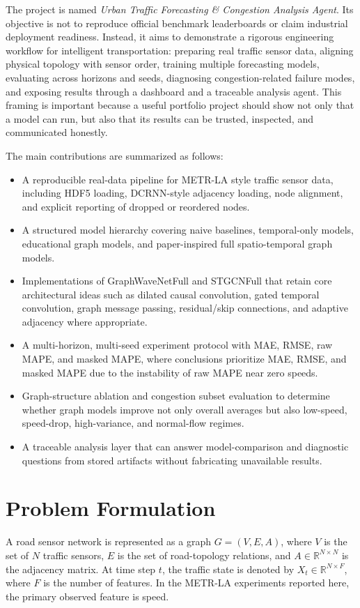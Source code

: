 \documentclass[11pt]{article}
\begin{document}
The project is named \emph{Urban Traffic Forecasting \& Congestion Analysis Agent}. Its objective is not to reproduce official benchmark leaderboards or claim industrial deployment readiness. Instead, it aims to demonstrate a rigorous engineering workflow for intelligent transportation: preparing real traffic sensor data, aligning physical topology with sensor order, training multiple forecasting models, evaluating across horizons and seeds, diagnosing congestion-related failure modes, and exposing results through a dashboard and a traceable analysis agent. This framing is important because a useful portfolio project should show not only that a model can run, but also that its results can be trusted, inspected, and communicated honestly.

The main contributions are summarized as follows:
\begin{itemize}[leftmargin=*]
  \item A reproducible real-data pipeline for METR-LA style traffic sensor data, including HDF5 loading, DCRNN-style adjacency loading, node alignment, and explicit reporting of dropped or reordered nodes.
  \item A structured model hierarchy covering naive baselines, temporal-only models, educational graph models, and paper-inspired full spatio-temporal graph models.
  \item Implementations of GraphWaveNetFull and STGCNFull that retain core architectural ideas such as dilated causal convolution, gated temporal convolution, graph message passing, residual/skip connections, and adaptive adjacency where appropriate.
  \item A multi-horizon, multi-seed experiment protocol with MAE, RMSE, raw MAPE, and masked MAPE, where conclusions prioritize MAE, RMSE, and masked MAPE due to the instability of raw MAPE near zero speeds.
  \item Graph-structure ablation and congestion subset evaluation to determine whether graph models improve not only overall averages but also low-speed, speed-drop, high-variance, and normal-flow regimes.
  \item A traceable analysis layer that can answer model-comparison and diagnostic questions from stored artifacts without fabricating unavailable results.
\end{itemize}

\section{Problem Formulation}
A road sensor network is represented as a graph $G=(V,E,A)$, where $V$ is the set of $N$ traffic sensors, $E$ is the set of road-topology relations, and $A\in\mathbb{R}^{N\times N}$ is the adjacency matrix. At time step $t$, the traffic state is denoted by $X_t\in\mathbb{R}^{N\times F}$, where $F$ is the number of features. In the METR-LA experiments reported here, the primary observed feature is speed.
\end{document}
